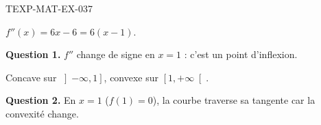 \begin{corrige}{TEXP-MAT-EX-037}

$f''(x) = 6x - 6 = 6(x-1)$.


\textbf{Question 1.} $f''$ change de signe en $x = 1$ : c'est un point d'inflexion.

Concave sur $\left]-\infty, 1\right]$, convexe sur $\left[1, +\infty\right[$.

\textbf{Question 2.} En $x = 1$ ($f(1) = 0$), la courbe traverse sa tangente car la convexité change.

\end{corrige}
